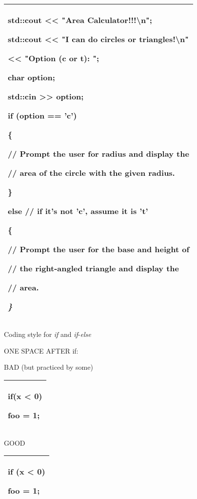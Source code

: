 \documentclass[
]{article}
\begin{document}
\begin{longtable}[]{@{}l@{}}
\toprule
\endhead
\begin{minipage}[t]{0.97\columnwidth}\raggedright
std::cout \textless\textless{} "Area Calculator!!!\textbackslash n";

std::cout \textless\textless{} "I can do circles or
triangles!\textbackslash n"

\textless\textless{} "Option (c or t): ";

char option;

std::cin \textgreater\textgreater{} option;

if (option == 'c')

\{

// Prompt the user for radius and display the

// area of the circle with the given radius.

\}

else // if it's not 'c', assume it is 't'

\{

// Prompt the user for the base and height of

// the right-angled triangle and display the

// area.

\emph{\}} \strut
\end{minipage}\tabularnewline
\bottomrule
\end{longtable}

Coding style for \emph{if} and \emph{if}-\emph{else}

ONE SPACE AFTER if:

BAD (but practiced by some)

\begin{longtable}[]{@{}l@{}}
\toprule
\endhead
\begin{minipage}[t]{0.97\columnwidth}\raggedright
if(x \textless{} 0)

foo = 1; \strut
\end{minipage}\tabularnewline
\bottomrule
\end{longtable}

GOOD

\begin{longtable}[]{@{}l@{}}
\toprule
\endhead
\begin{minipage}[t]{0.97\columnwidth}\raggedright
if (x \textless{} 0)

foo = 1; \strut
\end{minipage}\tabularnewline
\bottomrule
\end{longtable}
\end{document}

